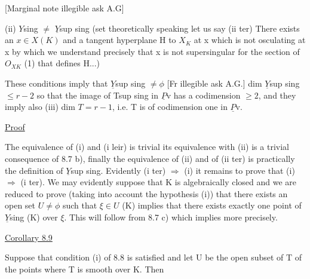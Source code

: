 
[Marginal note illegible ask A.G]\hand{*}

(ii) $Y$sing $\neq$ $\underline{Y}$sup sing (set theoretically speaking let us say
(ii ter) There exists an $x \in X(K)$ and a tangent hyperplane H to $X_{K}$
at x which is not osculating at x by which we understand precisely
that x is not supersingular for the section of $O_{XK}$ (1) that defines
H...)

These conditions imply that $\underline{Y}$sup sing $\neq \phi$ [Fr illegible ask
A.G.] dim $\underline{Y}$sup sing $\leq r - 2$ so that the image of Tsup sing in $\underline{P}$v has a
codimension $\geq 2$, and they imply also (iii) dim $T = r - 1$, i.e. T
is of codimension one in $\underline{P}$v.

\uline{Proof}

The equivalence of (i) and (i leir) is trivial its
equivalence with (ii) is a trivial consequence of 8.7 b), finally
the equivalence of (ii) and of (ii ter) is practically the
definition of $\underline{Y}$sup sing. Evidently (i ter) $\Rightarrow$ (i) it remains to
prove that (i) $\Rightarrow$ (i ter). We may evidently suppose that K is
algebraically closed and we are reduced to prove (taking into
account the hypothesis (i)) that there exists an open set $U \neq \phi$
such that $\xi \in U$ (K) implies that there exists exactly one point of
$\underline{Y}$sing (K) over $\xi$. This will follow from 8.7 c) which implies more
precisely.

\uline{Corollary 8.9}

Suppose that condition (i) of 8.8 is satisfied and let U be
the open subset of T of the points where T is smooth over K. Then


